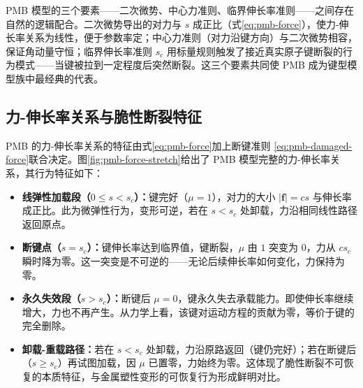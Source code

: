 \begin{remark}
PMB 模型的三个要素——二次微势、中心力准则、临界伸长率准则——之间存在自然的逻辑配合。二次微势导出的对力与 $s$ 成正比（式\eqref{eq:pmb-force}），使力-伸长率关系为线性，便于参数率定；中心力准则（对力沿键方向）与二次微势相容，保证角动量守恒；临界伸长率准则 $s_c$ 用标量规则触发了接近真实原子键断裂的行为模式——当键被拉到一定程度后突然断裂。这三个要素共同使 PMB 成为键型模型族中最经典的代表。
\end{remark}

\subsection{力-伸长率关系与脆性断裂特征}

PMB 的力-伸长率关系的特征由式\eqref{eq:pmb-force}加上断键准则 \eqref{eq:pmb-damaged-force}联合决定。图\ref{fig:pmb-force-stretch}给出了 PMB 模型完整的力-伸长率关系，其行为特征如下：

\begin{itemize}
\item \textbf{线弹性加载段（$0\leq s < s_c$）：}键完好（$\mu=1$），对力的大小 $|\mathbf{f}|=c s$ 与伸长率成正比。此为微弹性行为，变形可逆，若在 $s<s_c$ 处卸载，力沿相同线性路径返回原点。

\item \textbf{断键点（$s=s_c$）：}键伸长率达到临界值，键断裂，$\mu$ 由 $1$ 突变为 $0$，力从 $c s_c$ 瞬时降为零。这一突变是不可逆的——无论后续伸长率如何变化，力保持为零。

\item \textbf{永久失效段（$s>s_c$）：}断键后 $\mu=0$，键永久失去承载能力。即使伸长率继续增大，力也不再产生。从力学上看，该键对运动方程的贡献为零，等价于键的完全删除。

\item \textbf{卸载-重载路径：}若在 $s<s_c$ 处卸载，力沿原路返回（键仍完好）；若在断键后（$s\geq s_c$）再试图加载，因 $\mu$ 已置零，力始终为零。这体现了脆性断裂不可恢复的本质特征，与金属塑性变形的可恢复行为形成鲜明对比。

\end{itemize}

